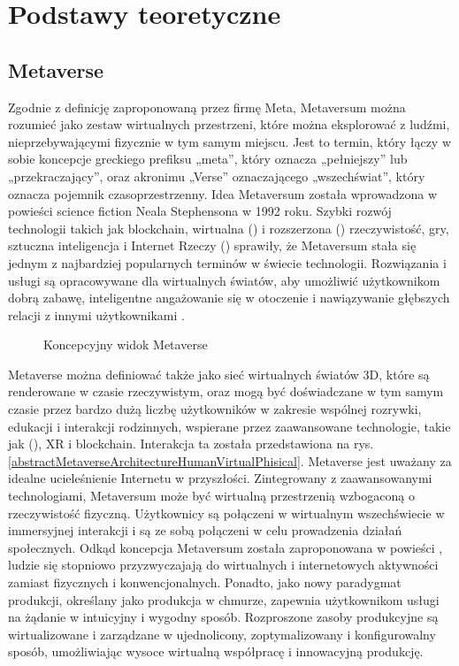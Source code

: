 
\chapter{Podstawy teoretyczne}
\section{Metaverse}


Zgodnie z definicję zaproponowaną przez firmę Meta, Metaversum można rozumieć jako zestaw wirtualnych przestrzeni, które można eksplorować z ludźmi, nieprzebywającymi fizycznie w tym samym miejscu\cite{metaverseMetaDef}\cite{metaverseDefinitionReview}. Jest to termin, który łączy w sobie koncepcje greckiego prefiksu „meta”, który oznacza „pełniejszy” lub „przekraczający”, oraz akronimu „Verse” oznaczającego „wszechświat”, który oznacza pojemnik czasoprzestrzenny. Idea Metaversum została wprowadzona w powieści science fiction Neala Stephensona  w 1992 roku. Szybki rozwój technologii takich jak blockchain, wirtualna () i rozszerzona () rzeczywistość, gry, sztuczna inteligencja i Internet Rzeczy  () sprawiły, że Metaversum stała się jednym z najbardziej popularnych terminów w świecie technologii. Rozwiązania i usługi są opracowywane dla wirtualnych światów, aby umożliwić użytkownikom dobrą zabawę, inteligentne angażowanie się w otoczenie i nawiązywanie głębszych relacji z innymi użytkownikami \cite{metaverseAsAService}. 

\begin{figure}[htbp!]
    \centering
    
    \caption{Koncepcyjny widok Metaverse\cite{metaverseUseCaseslee}}
    \label{fig:enter-label}
\end{figure}

Metaverse można definiować także jako sieć wirtualnych światów 3D, które są renderowane w czasie rzeczywistym, oraz mogą być doświadczane w tym samym czasie przez bardzo dużą liczbę użytkowników w zakresie wspólnej rozrywki, edukacji i interakcji rodzinnych, wspierane przez zaawansowane technologie, takie jak  (), XR i blockchain. Interakcja ta została przedstawiona na rys.\ref{abstractMetaverseArchitectureHumanVirtualPhisical}. Metaverse jest uważany za idealne ucieleśnienie Internetu w przyszłości. Zintegrowany z zaawansowanymi technologiami, Metaversum może być wirtualną przestrzenią wzbogaconą o rzeczywistość fizyczną. Użytkownicy są połączeni w wirtualnym wszechświecie w immersyjnej interakcji i są ze sobą połączeni w celu prowadzenia działań społecznych. Odkąd koncepcja Metaversum została zaproponowana w powieści , ludzie się stopniowo przyzwyczajają do wirtualnych i internetowych aktywności zamiast fizycznych i konwencjonalnych. Ponadto, jako nowy paradygmat produkcji, określany jako produkcja w chmurze, zapewnia użytkownikom usługi na żądanie w intuicyjny i wygodny sposób. Rozproszone zasoby produkcyjne są wirtualizowane i zarządzane w ujednolicony, zoptymalizowany i konfigurowalny sposób, umożliwiając wysoce wirtualną współpracę i innowacyjną produkcję\cite{industrialMetaverseForSmartManufacturing}. 

